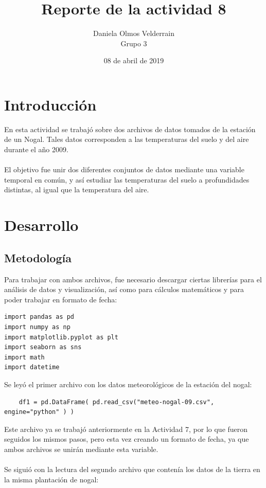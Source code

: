 \documentclass[letterpaper,12pt]{article}
\begin{document}
\title{Reporte de la actividad 8}
\author{Daniela Olmos Velderrain\\Grupo 3}
\date{08 de abril de 2019}

\maketitle

\section{Introducción}
En esta actividad se trabajó sobre dos archivos de datos tomados de la estación de un Nogal. Tales datos corresponden a las temperaturas del suelo y del aire durante el año 2009. 
\\
\\
El objetivo fue unir dos diferentes conjuntos de datos mediante una variable temporal en común, y así estudiar las temperaturas del suelo a profundidades distintas, al igual que la temperatura del aire.
    
    
\section{Desarrollo}
\subsection{Metodología} 
Para trabajar con ambos archivos, fue necesario descargar ciertas librerías para el análisis de datos y visualización, así como para cálculos matemáticos y para poder trabajar en formato de fecha:

\begin{verbatim}
import pandas as pd
import numpy as np
import matplotlib.pyplot as plt
import seaborn as sns
import math
import datetime
\end{verbatim}

Se leyó el primer archivo con los datos meteorológicos de la estación del nogal:

\begin{verbatim}
    df1 = pd.DataFrame( pd.read_csv("meteo-nogal-09.csv", engine="python" ) )
\end{verbatim}

Este archivo ya se trabajó anteriormente en la Actividad 7, por lo que fueron seguidos los mismos pasos, pero esta vez creando un formato de fecha, ya que ambos archivos se unirán mediante esta variable.
\\
\\
Se siguió con la lectura del segundo archivo que contenía los datos de la tierra en la misma plantación de nogal:
\end{document}

